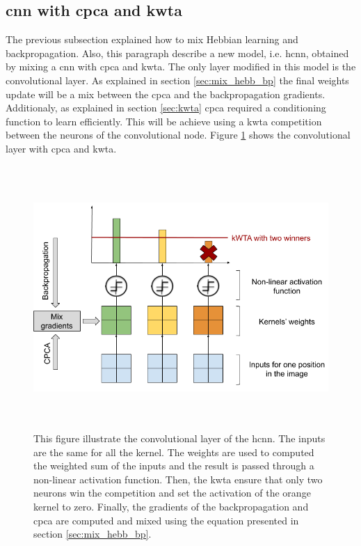 \documentclass[11pt]{report}
\begin{document}
\subsection{\acrshort{cnn} with \acrshort{cpca} and \acrshort{kwta}}
The previous subsection explained how to mix Hebbian learning and backpropagation. Also, this paragraph describe a new model, i.e. \acrshort{hcnn}, obtained by mixing a \acrshort{cnn} with \acrshort{cpca} and \acrshort{kwta}. The only layer modified in this model is the convolutional layer. As explained in section \ref{sec:mix_hebb_bp} the final weights update will be a mix between the \acrshort{cpca} and the backpropagation gradients. Additionaly, as explained in section \ref{sec:kwta} \acrshort{cpca} required a conditioning function to learn efficiently. This will be achieve using a \acrshort{kwta} competition between the neurons of the convolutional node. Figure \ref{fig:hcnn} shows the convolutional layer with \acrshort{cpca} and \acrshort{kwta}.

\begin{figure}[h]
\centering
\includegraphics[width=15cm, height=10cm]{hcnn}
\caption[Illustration of the \acrlong{hcnn}]{This figure illustrate the convolutional layer of the \acrlong{hcnn}. The inputs are the same for all the kernel. The weights are used to computed the weighted sum of the inputs and the result is passed through a non-linear activation function. Then, the \acrshort{kwta} ensure that only two neurons win the competition and set the activation of the orange kernel to zero. Finally, the gradients of the backpropagation and \acrshort{cpca} are computed and mixed using the equation presented in section \ref{sec:mix_hebb_bp}.}
\label{fig:hcnn}
\end{figure}
\end{document}
